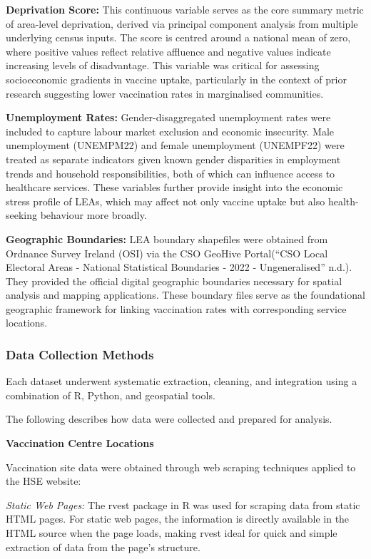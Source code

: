 \documentclass{article}
\begin{document}
\textbf{Deprivation Score:} This continuous variable serves as the core
summary metric of area-level deprivation, derived via principal
component analysis from multiple underlying census inputs. The score is
centred around a national mean of zero, where positive values reflect
relative affluence and negative values indicate increasing levels of
disadvantage. This variable was critical for assessing socioeconomic
gradients in vaccine uptake, particularly in the context of prior
research suggesting lower vaccination rates in marginalised communities.

\textbf{Unemployment Rates:} Gender-disaggregated unemployment rates
were included to capture labour market exclusion and economic
insecurity. Male unemployment (UNEMPM22) and female unemployment
(UNEMPF22) were treated as separate indicators given known gender
disparities in employment trends and household responsibilities, both of
which can influence access to healthcare services. These variables
further provide insight into the economic stress profile of LEAs, which
may affect not only vaccine uptake but also health-seeking behaviour
more broadly.

\textbf{Geographic Boundaries:} LEA boundary shapefiles were obtained
from Ordnance Survey Ireland (OSI) via the CSO GeoHive Portal({``{CSO}
{Local} {Electoral} {Areas} - {National} {Statistical} {Boundaries} -
2022 - {Ungeneralised}''} n.d.). They provided the official digital
geographic boundaries necessary for spatial analysis and mapping
applications. These boundary files serve as the foundational geographic
framework for linking vaccination rates with corresponding service
locations.

\subsubsection{Data Collection Methods}\label{data-collection-methods}

Each dataset underwent systematic extraction, cleaning, and integration
using a combination of R, Python, and geospatial tools.

The following describes how data were collected and prepared for
analysis.

\textbf{Vaccination Centre Locations}

Vaccination site data were obtained through web scraping techniques
applied to the HSE website:

\emph{Static Web Pages:} The rvest package in R was used for scraping
data from static HTML pages. For static web pages, the information is
directly available in the HTML source when the page loads, making rvest
ideal for quick and simple extraction of data from the page's structure.
\end{document}
